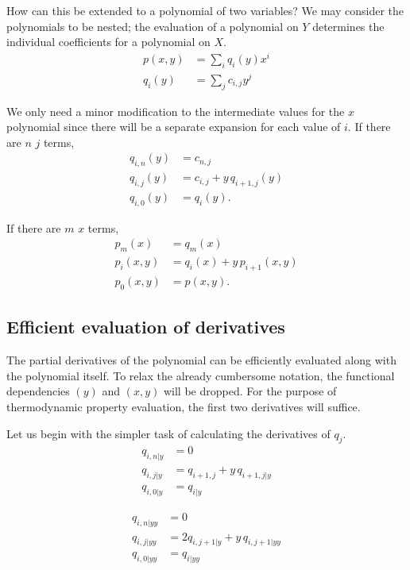 \documentclass[letterpaper,11pt]{article}
\begin{document}
How can this be extended to a polynomial of two variables?  We may consider the polynomials to be nested; the evaluation of a polynomial on $Y$ determines the individual coefficients for a polynomial on $X$.
\begin{align}
p(x,y) &= \sum_i q_i(y) x^i\\
q_i(y) &= \sum_j c_{i,j} y^j
\end{align}

We only need a minor modification to the intermediate values for the $x$ polynomial since there will be a separate expansion for each value of $i$.  If there are $n$ $j$ terms,
\begin{subequations}
\begin{align}
q_{i,n}(y) &= c_{n,j}\\
q_{i,j}(y) &= c_{i,j} + y\,q_{i+1,j}(y)\\
q_{i,0}(y) &= q_i(y).
\end{align}
\end{subequations}

If there are $m$ $x$ terms,
\begin{subequations}
\begin{align}
p_m(x) &= q_m(x)\\
p_i(x,y) &= q_i(x) + y\,p_{i+1}(x,y)\\
p_0(x,y) &= p(x,y).
\end{align}
\end{subequations}

\subsection{Efficient evaluation of derivatives}
The partial derivatives of the polynomial can be efficiently evaluated along with the polynomial itself. To relax the already cumbersome notation, the functional dependencies $(y)$ and $(x,y)$ will be dropped.  For the purpose of thermodynamic property evaluation, the first two derivatives will suffice.

Let us begin with the simpler task of calculating the derivatives of $q_j$.
\begin{subequations}
\begin{align}
q_{i,n|y} &= 0\\
q_{i,j|y} &= q_{i+1,j} + y\,q_{i+1,j|y}\\
q_{i,0|y} &= q_{i|y}
\end{align}
\end{subequations}

\begin{subequations}
\begin{align}
q_{i,n|yy} &= 0\\
q_{i,j|yy} &= 2 q_{i,j+1|y} + y\,q_{i,j+1|yy}\\
q_{i,0|yy} &= q_{i|yy}
\end{align}
\end{subequations}
\end{document}
